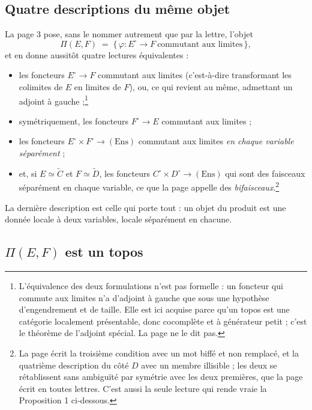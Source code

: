 \documentclass[11pt,a4paper]{article}
\begin{document}
\subsection*{Quatre descriptions du même objet}

La page 3 pose, sans le nommer autrement que par la lettre, l'objet
\[
\Pi(E,F) \;=\; \bigl\{\, \varphi : E^{\circ} \to F \ \text{commutant aux
limites} \,\bigr\},
\]
et en donne aussitôt quatre lectures équivalentes :

\begin{itemize}
\item les foncteurs $E^{\circ} \to F$ commutant aux limites (c'est-à-dire
transformant les colimites de $E$ en limites de $F$), ou, ce qui revient au
même, admettant un adjoint à gauche ;\footnote{L'équivalence des deux
formulations n'est pas formelle : un foncteur qui commute aux limites n'a
d'adjoint à gauche que sous une hypothèse d'engendrement et de taille. Elle
est ici acquise parce qu'un topos est une catégorie localement présentable,
donc cocomplète et à générateur petit ; c'est le théorème de l'adjoint spécial.
La page ne le dit pas.}
\item symétriquement, les foncteurs $F^{\circ} \to E$ commutant aux limites ;
\item les foncteurs $E^{\circ} \times F^{\circ} \to (\mathrm{Ens})$ commutant
aux limites \emph{en chaque variable séparément} ;
\item et, si $E \simeq \widetilde{C}$ et $F \simeq \widetilde{D}$, les
foncteurs $C^{\circ} \times D^{\circ} \to (\mathrm{Ens})$ qui sont des faisceaux
séparément en chaque variable, ce que la page appelle des
\emph{bifaisceaux}.\footnote{La page écrit la troisième condition avec un mot
biffé et non remplacé, et la quatrième description du côté $D$ avec un membre
illisible ; les deux se rétablissent sans ambiguïté par symétrie avec les deux
premières, que la page écrit en toutes lettres. C'est aussi la seule lecture
qui rende vraie la Proposition 1 ci-dessous.}
\end{itemize}

La dernière description est celle qui porte tout : un objet du produit est une
donnée locale à deux variables, locale séparément en chacune.

\subsection*{$\Pi(E,F)$ est un topos}
\end{document}
